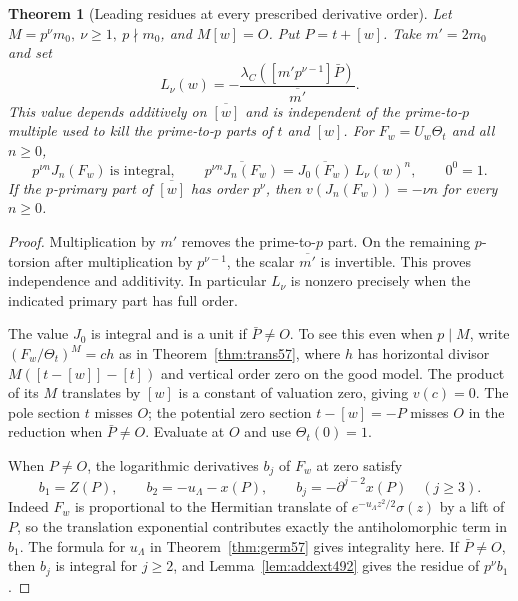 \documentclass[a4paper,11pt]{article}
\newtheorem{theorem}[proposition]{Theorem}
\theoremstyle{definition}
\theoremstyle{remark}
\numberwithin{equation}{section}
\begin{document}
\begin{theorem}[Leading residues at every prescribed derivative order]\leavevmode
\label{thm:residuejet492}
Let \(M=p^\nu m_0,\ \nu\ge1,\ p\nmid m_0\), and \(M[w]=O\).
Put \(P=t+[w]\). Take \(m'=2m_0\) and set
\[
  L_\nu(w)=-\frac{\lambda_C([m'p^{\nu-1}]\bar P)}
                          {\overline{m'}} .
\]
This value depends additively on \(\overline{[w]}\) and is
independent of the prime-to-\(p\) multiple used to kill the
prime-to-\(p\) parts of \(t\) and \([w]\).
For \(F_w=U_w\Theta_t\) and all \(n\ge0\),
\[
 p^{\nu n}J_n(F_w)\ \text{is integral},\qquad
 \overline{p^{\nu n}J_n(F_w)}
       =\overline{J_0(F_w)}\,L_\nu(w)^n,\qquad 0^0=1.
\]
If the \(p\)-primary part of \(\overline{[w]}\) has order
\(p^\nu\), then \(v(J_n(F_w))=-\nu n\) for every \(n\ge0\).
\end{theorem}
\begin{proof}
Multiplication by \(m'\) removes the prime-to-\(p\) part.
On the remaining \(p\)-torsion after multiplication by
\(p^{\nu-1}\), the scalar \(\overline{m'}\) is invertible.
This proves independence and additivity. In particular \(L_\nu\)
is nonzero precisely when the indicated primary part has full order.

The value \(J_0\) is integral and is a unit if \(\bar P\ne O\).
To see this even when \(p\mid M\), write
\((F_w/\Theta_t)^M=c h\) as in Theorem~\ref{thm:trans57},
where \(h\) has horizontal divisor \(M([t-[w]]-[t])\) and
vertical order zero on the good model. The product of its \(M\)
translates by \([w]\) is a constant of valuation zero, giving
\(v(c)=0\). The pole section \(t\) misses \(O\); the potential
zero section \(t-[w]=-P\) misses \(O\) in the reduction when
\(\bar P\ne O\). Evaluate at \(O\) and use \(\Theta_t(0)=1\).

When \(P\ne O\), the logarithmic derivatives \(b_j\) of \(F_w\)
at zero satisfy
\[
 b_1=Z(P),\qquad b_2=-u_\Lambda-x(P),\qquad
 b_j=-\partial^{j-2}x(P)\quad(j\ge3).
\]
Indeed \(F_w\) is proportional to the Hermitian translate of
\(e^{-u_\Lambda z^2/2}\sigma(z)\) by a lift of \(P\), so the
translation exponential contributes exactly the antiholomorphic
term in \(b_1\). The formula for \(u_\Lambda\) in
Theorem~\ref{thm:germ57} gives integrality here.
If \(\bar P\ne O\), then \(b_j\) is integral for \(j\ge2\),
and Lemma~\ref{lem:addext492} gives the residue of \(p^\nu b_1\).


\end{proof}
\end{document}
